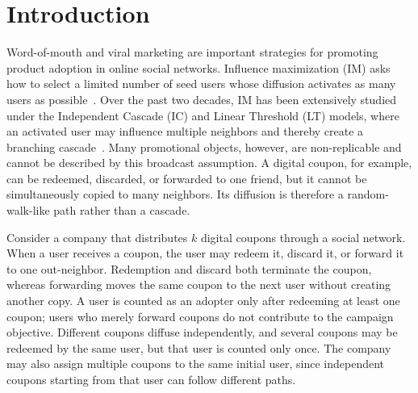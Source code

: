 \documentclass[sigconf,balance=false]{acmart}
\begin{document}


\maketitle


\section{Introduction}
\label{sec:intro}

Word-of-mouth and viral marketing are important strategies for promoting
product adoption in online social networks.
Influence maximization (IM) asks how to select a limited number of seed
users whose diffusion activates as many users as possible~\cite{kempe2003maximizing}.
Over the past two decades, IM has been extensively studied under the
Independent Cascade (IC) and Linear Threshold (LT) models, where an
activated user may influence multiple neighbors and thereby create a
branching cascade~\cite{domingos2001mining,borgs2014maximizing,tang2015influence}.
Many promotional objects, however, are non-replicable and cannot be
described by this broadcast assumption.
A digital coupon, for example, can be redeemed, discarded, or forwarded
to one friend, but it cannot be simultaneously copied to many neighbors.
Its diffusion is therefore a random-walk-like path rather than a cascade.

Consider a company that distributes $k$ digital coupons through a social
network.
When a user receives a coupon, the user may redeem it, discard it, or
forward it to one out-neighbor.
Redemption and discard both terminate the coupon, whereas forwarding
moves the same coupon to the next user without creating another copy.
A user is counted as an adopter only after redeeming at least one coupon;
users who merely forward coupons do not contribute to the campaign
objective.
Different coupons diffuse independently, and several coupons may be
redeemed by the same user, but that user is counted only once.
The company may also assign multiple coupons to the same initial user,
since independent coupons starting from that user can follow different
paths.
\end{document}
